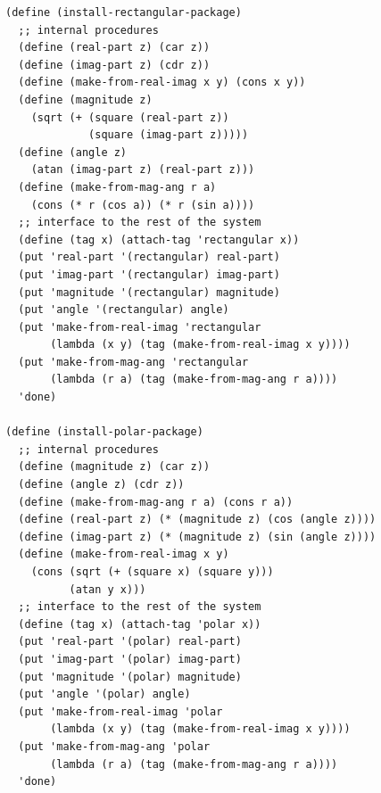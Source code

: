 \documentclass[final,fleqn,titlepage,twoside]{article}
\begin{document}
\begin{verbatim}
(define (install-rectangular-package)
  ;; internal procedures
  (define (real-part z) (car z))
  (define (imag-part z) (cdr z))
  (define (make-from-real-imag x y) (cons x y))
  (define (magnitude z)
    (sqrt (+ (square (real-part z))
             (square (imag-part z)))))
  (define (angle z)
    (atan (imag-part z) (real-part z)))
  (define (make-from-mag-ang r a)
    (cons (* r (cos a)) (* r (sin a))))
  ;; interface to the rest of the system
  (define (tag x) (attach-tag 'rectangular x))
  (put 'real-part '(rectangular) real-part)
  (put 'imag-part '(rectangular) imag-part)
  (put 'magnitude '(rectangular) magnitude)
  (put 'angle '(rectangular) angle)
  (put 'make-from-real-imag 'rectangular
       (lambda (x y) (tag (make-from-real-imag x y))))
  (put 'make-from-mag-ang 'rectangular
       (lambda (r a) (tag (make-from-mag-ang r a))))
  'done)

(define (install-polar-package)
  ;; internal procedures
  (define (magnitude z) (car z))
  (define (angle z) (cdr z))
  (define (make-from-mag-ang r a) (cons r a))
  (define (real-part z) (* (magnitude z) (cos (angle z))))
  (define (imag-part z) (* (magnitude z) (sin (angle z))))
  (define (make-from-real-imag x y)
    (cons (sqrt (+ (square x) (square y)))
          (atan y x)))
  ;; interface to the rest of the system
  (define (tag x) (attach-tag 'polar x))
  (put 'real-part '(polar) real-part)
  (put 'imag-part '(polar) imag-part)
  (put 'magnitude '(polar) magnitude)
  (put 'angle '(polar) angle)
  (put 'make-from-real-imag 'polar
       (lambda (x y) (tag (make-from-real-imag x y))))
  (put 'make-from-mag-ang 'polar
       (lambda (r a) (tag (make-from-mag-ang r a))))
  'done)


\end{verbatim}
\end{document}
